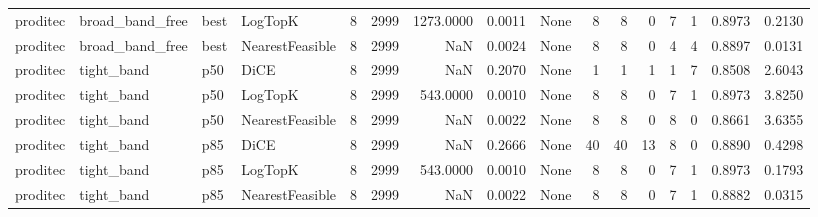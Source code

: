 \begin{tabular}{llllrrrrlrrrrrrr}
proditec &      broad\_band\_free &   best &         LogTopK &            8 &                 2999 &                1273.0000 &      0.0011 &                                               None &      8 &            8 &        0 &              7 &          1 &             0.8973 &         0.2130 \\
proditec &      broad\_band\_free &   best & NearestFeasible &            8 &                 2999 &                      NaN &      0.0024 &                                               None &      8 &            8 &        0 &              4 &          4 &             0.8897 &         0.0131 \\
proditec &           tight\_band &    p50 &            DiCE &            8 &                 2999 &                      NaN &      0.2070 &                                               None &      1 &            1 &        1 &              1 &          7 &             0.8508 &         2.6043 \\
proditec &           tight\_band &    p50 &         LogTopK &            8 &                 2999 &                 543.0000 &      0.0010 &                                               None &      8 &            8 &        0 &              7 &          1 &             0.8973 &         3.8250 \\
proditec &           tight\_band &    p50 & NearestFeasible &            8 &                 2999 &                      NaN &      0.0022 &                                               None &      8 &            8 &        0 &              8 &          0 &             0.8661 &         3.6355 \\
proditec &           tight\_band &    p85 &            DiCE &            8 &                 2999 &                      NaN &      0.2666 &                                               None &     40 &           40 &       13 &              8 &          0 &             0.8890 &         0.4298 \\
proditec &           tight\_band &    p85 &         LogTopK &            8 &                 2999 &                 543.0000 &      0.0010 &                                               None &      8 &            8 &        0 &              7 &          1 &             0.8973 &         0.1793 \\
proditec &           tight\_band &    p85 & NearestFeasible &            8 &                 2999 &                      NaN &      0.0022 &                                               None &      8 &            8 &        0 &              7 &          1 &             0.8882 &         0.0315 \\

\end{tabular}
